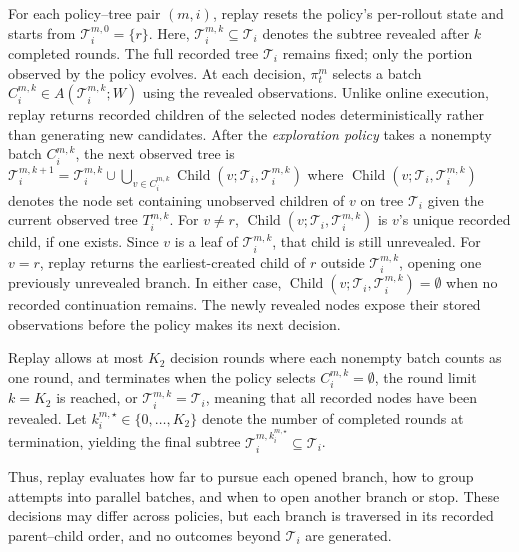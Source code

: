 For each policy--tree pair \((m,i)\), replay resets the policy's
per-rollout state and starts from \(\mathcal T_i^{m,0}=\{r\}\).
Here, \(\mathcal T_i^{m,k}\subseteq\mathcal T_i\) denotes the subtree
revealed after \(k\) completed rounds. The full recorded tree
\(\mathcal T_i\) remains fixed; only the portion observed by the
policy evolves. At each decision, \(\pi_t^m\) selects a batch
\(C_i^{m,k}\in A(\mathcal T_i^{m,k};W)\) using the revealed
observations. Unlike online execution, replay returns recorded children of the
selected nodes deterministically rather than generating new candidates.
After the \emph{exploration policy} takes a nonempty batch $C_i^{m,k}$, the next observed tree is
\(\mathcal T_i^{m,k+1}
=\mathcal T_i^{m,k}
\cup\bigcup_{v\in C_i^{m,k}}
\operatorname{Child}(v;\mathcal T_i,\mathcal T_i^{m,k})\) where \(\operatorname{Child}(v;\mathcal T_i,\mathcal T_i^{m,k})\) denotes the node set containing unobserved children of $v$ on tree $\mathcal T_i$ given the current observed tree $T_i^{m,k}$. For \(v\ne r\), \(\operatorname{Child}(v;\mathcal T_i,\mathcal T_i^{m,k})\) is \(v\)'s unique recorded child, if one exists. Since \(v\) is a leaf of \(\mathcal T_i^{m,k}\), that child is still unrevealed.
For \(v=r\), replay returns the earliest-created child of \(r\)
outside \(\mathcal T_i^{m,k}\), opening one previously unrevealed branch.
In either case, \(\operatorname{Child}(v;\mathcal T_i,\mathcal T_i^{m,k})
=\emptyset\) when no recorded continuation remains. The newly revealed nodes expose their stored observations before
the policy makes its next decision.

Replay allows at most \(K_2\) decision rounds where each nonempty batch counts as one round, and terminates when
the policy selects \(C_i^{m,k}=\emptyset\), the round limit
\(k=K_2\) is reached, or \(\mathcal T_i^{m,k}=\mathcal T_i\),
meaning that all recorded nodes have been revealed.
Let \(k_i^{m,\star}\in\{0,\ldots,K_2\}\) denote the number of
completed rounds at termination, yielding the final subtree
\(\mathcal T_i^{m,k_i^{m,\star}}\subseteq\mathcal T_i\).

Thus, replay evaluates how far to pursue each opened branch,
how to group attempts into parallel batches, and when to open
another branch or stop. These decisions may differ across policies,
but each branch is traversed in its recorded parent--child order,
and no outcomes beyond \(\mathcal T_i\) are generated.




